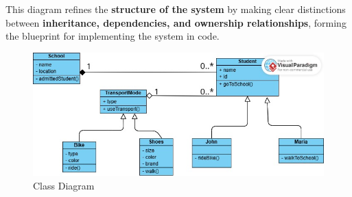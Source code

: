 This diagram refines the \textbf{structure of the system} by making clear distinctions between \textbf{inheritance, dependencies, and ownership relationships}, forming the blueprint for implementing the system in code.


\begin{figure}[h]
    \centering
    \includegraphics[scale=0.6]{Book-SSW565/jpg/ArchitectureModeling/Class_Diagram.jpg}
    \caption{\label{Figure::Class Diagram}Class Diagram}
\end{figure}

